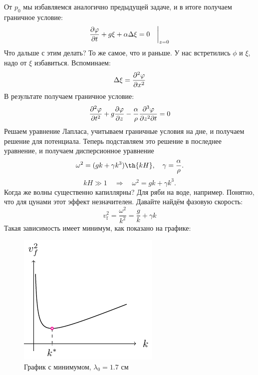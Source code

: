 От $p_0$ мы избавляемся аналогично предыдущей задаче, и в итоге получаем граничное условие:
\begin{equation}
    \pdv{\varphi}{t}+g\xi+\alpha\Delta\xi = 0 \quad\bigg|_{z = 0}
\end{equation}
Что дальше с этим делать? То же самое, что и раньше. У нас встретились $\phi$ и $\xi$, надо от $\xi$ избавиться. Вспоминаем:
\begin{equation}
    \Delta\xi = \pdv[2]{\varphi}{x}
\end{equation}
В результате получаем граничное условие:
\begin{equation}
    \pdv[2]{\varphi}{t}+g\pdv{\varphi}{z}-\frac{\alpha}{\rho}\frac{\partial^3\varphi}{\partial z^2 \partial t} = 0
\end{equation}
Решаем уравнение Лапласа, учитываем граничные условия на дне, и получаем  решение для потенциала. Теперь подставляем это решение в последнее уравнение, и получаем дисперсионное уравнение
\begin{equation}
    \omega^2 = (gk+\gamma k^3)\th{kH}, \quad \gamma = \frac{\alpha}{\rho}.
\end{equation}
\begin{equation}
    kH \gg 1 \quad \Rightarrow \quad \omega^2 = gk+\gamma k^3.
\end{equation}
Когда же волны существенно капиллярны? Для ряби на воде, например. Понятно, что для цунами этот эффект незначителен. Давайте найдём фазовую скорость:
\begin{equation}
    v_\text{f}^2 = \frac{\omega^2}{k^2} = \frac{g}{k}+\gamma k 
\end{equation}
Такая зависимость имеет минимум, как показано на графике:
\begin{figure}[H]
    \centering
    \includegraphics[scale=1.5]{img/min}
    \caption{График с минимумом, $\lambda_0 = 1.7 \text{ см}$}
    \label{fig:figure1}
\end{figure}

